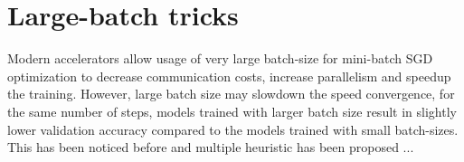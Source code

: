 % 



\section{Large-batch tricks} \label{sec: large-batch}

Modern accelerators allow usage of very large batch-size for mini-batch SGD optimization to decrease communication costs, increase parallelism and speedup the training. However, large batch size may slowdown the speed convergence, for the same number of steps, models trained with larger batch size result in slightly lower validation accuracy compared to the models trained with small batch-sizes. This has been noticed before and multiple heuristic has been proposed ...

